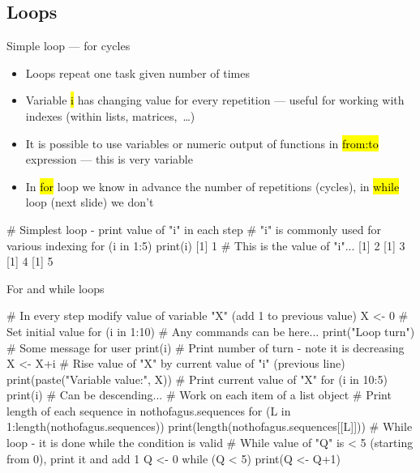 \documentclass[compress, ucs, xelatex, 11pt, xcolor=svgnames,
  hyperref={
    bookmarks=true,
    unicode=true,
    colorlinks=true,
    pdftitle={Molecular data in R},
    plainpages=false,
    pdfauthor={Vojtech Zeisek},
    pdfsubject={Course about phylogeny and evolution in R},
    pdfcreator={XeLaTeX},
    pdfkeywords={R, evolution, phylogeny, molecular data},
    linkcolor=Tomato,
    anchorcolor=SaddleBrown,
    citecolor=Goldenrod,
    filecolor=DarkMagenta,
    menucolor=Sienna,
    urlcolor=DarkTurquoise,
    pdftex},
  url={hyphens, lowtilde} %
  ]{beamer}
\renewcommand{\texttt}[1]{\hl{\ttfamily #1}}
\begin{document}
\subsection{Loops}

\begin{frame}[fragile]{Simple loop --- for cycles}
  \begin{itemize}
    \item Loops repeat one task given number of times
    \item Variable \texttt{i} has changing value for every repetition --- useful for working with indexes (within lists, matrices,~\ldots)
    \item It is possible to use variables or numeric output of functions in \texttt{from:to} expression --- this is very variable
    \item In \texttt{for} loop we know in advance the number of repetitions (cycles), in \texttt{while} loop (next slide) we don't
  \end{itemize}
  \begin{spluscode}
    # Simplest loop - print value of "i" in each step
    # "i" is commonly used for various indexing
    for (i in 1:5) { print(i) }
    [1] 1 # This is the value of "i"...
    [1] 2
    [1] 3
    [1] 4
    [1] 5
  \end{spluscode}
\end{frame}

\begin{frame}[fragile]{For and while loops}
  \begin{spluscode}
    # In every step modify value of variable "X" (add 1 to previous value)
    X <- 0 # Set initial value
    for (i in 1:10) {
      # Any commands can be here...
      print("Loop turn") # Some message for user
      print(i) # Print number of turn - note it is decreasing
      X <- X+i # Rise value of "X" by current value of "i" (previous line)
      print(paste("Variable value:", X)) # Print current value of "X"
      }
    for (i in 10:5) { print(i) } # Can be descending...
    # Work on each item of a list object
    # Print length of each sequence in nothofagus.sequences
    for (L in 1:length(nothofagus.sequences)) {
      print(length(nothofagus.sequences[[L]])) }
    # While loop - it is done while the condition is valid
    # While value of "Q" is < 5 (starting from 0), print it and add 1
    Q <- 0
    while (Q < 5) { print(Q <- Q+1) }
  \end{spluscode}
\end{frame}
\end{document}
